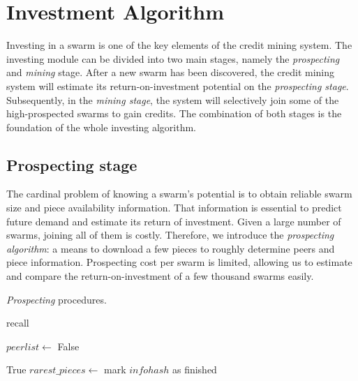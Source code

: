 \chapter{Investment Algorithm}
\label{chapter:prospection}
Investing in a swarm is one of the key elements of the credit mining system. The investing module can be divided into two main stages, namely the \textit{prospecting} and \textit{mining} stage. After a new swarm has been discovered, the credit mining system will estimate its return-on-investment potential on the \textit{prospecting stage}. Subsequently, in the \textit{mining stage}, the system will selectively join some of the high-prospected swarms to gain credits. The combination of both stages is the foundation of the whole investing algorithm. 

\section{Prospecting stage}
The cardinal problem of knowing a swarm's potential is to obtain reliable swarm size and piece availability information. That information is essential to predict future demand and estimate its return of investment. Given a large number of swarms, joining all of them is costly. Therefore, we introduce the \textit{prospecting algorithm}: a means to download a few pieces to roughly determine peers and piece information. Prospecting cost per swarm is limited, allowing us to estimate and compare the return-on-investment of a few thousand swarms easily.

\begin{algorithm}[h!]
	\caption{\textit{Prospecting} procedures.}
	\label{alg:prospectg}
	\begin{algorithmic}[1]
		\State recall 
		\EndIf
		\State {}
		\State {}
		\State {}
		\State \Return {}
		\EndFunction
		
		\State $peerlist \gets$ 
		\State {}
		\State {}
		\State \Return False
		\EndIf
		
		\State {}
		\State \Return True
		\EndIf
		\State $rarest\_pieces \gets$  \label{alg:prospectg:callrarepc}
			\State {}
		\EndFor
		\State mark $infohash$ as finished
		\EndIf
		\State \Return {}
		\EndFunction		
	\end{algorithmic}
\end{algorithm}

